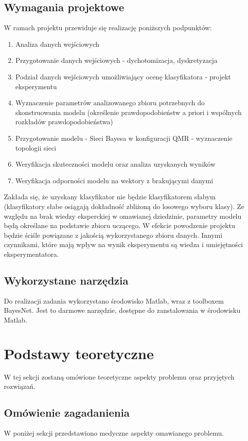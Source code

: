 \documentclass{article}
\begin{document}
\subsection{Wymagania projektowe}
W ramach projektu przewiduje się realizację poniższych podpunktów:
\begin{enumerate}
	\item Analiza danych wejściowych
	\item Przygotowanie danych wejściowych - dychotomizacja, dyskretyzacja
	\item Podział danych wejściowych umożliwiający ocenę klasyfikatora - projekt eksperymentu
	\item Wyznaczenie parametrów analizowanego zbioru potrzebnych do skonstruowania modelu (określenie prawdopodobieństw a priori i wspólnych rozkładów prawdopodobieństwa)
	\item Przygotowanie modelu - Sieci Bayesa w konfiguracji QMR - wyznaczenie topologii sieci
	\item Weryfikacja skuteczności modelu oraz analiza uzyskanych wyników
	\item Weryfikacja odporności modelu na wektory z brakującymi danymi
\end{enumerate}

Zakłada się, że uzyskany klasyfikator nie będzie klasyfikatorem słabym (klasyfikatory słabe osiągają dokładność zbliżoną do losowego wyboru klasy). Ze względu na brak wiedzy eksperckiej w omawianej dziedzinie, parametry modelu będą określane na podstawie zbioru uczącego. W efekcie powodzenie projektu będzie ściśle powiązane z jakością wykorzystanego zbioru danych. Innymi czynnikami, które mają wpływ na wynik eksperymentu są wiedza i umiejętności eksperymentatora.

\subsection{Wykorzystane narzędzia}
Do realizacji zadania wykorzystano środowisko Matlab, wraz z toolboxem BayesNet. Jest to darmowe narzędzie, dostępne do zanstalowania w środowisku Matlab. 

\newpage
\section{Podstawy teoretyczne}
W tej sekcji zostaną omówione teoretyczne aspekty problemu oraz przyjętych rozwiązań.

\subsection{Omówienie zagadanienia}
W poniżej sekcji przedstawiono medyczne aspekty omawianego problemu.
\end{document}
